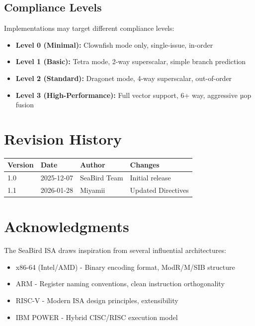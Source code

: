 \documentclass[12pt]{article}
\begin{document}
\subsection{Compliance Levels}

Implementations may target different compliance levels:

\begin{itemize}
    \item \textbf{Level 0 (Minimal):} Clownfish mode only, single-issue, in-order
    \item \textbf{Level 1 (Basic):} Tetra mode, 2-way superscalar, simple branch prediction
    \item \textbf{Level 2 (Standard):} Dragonet mode, 4-way superscalar, out-of-order
    \item \textbf{Level 3 (High-Performance):} Full vector support, 6+ way, aggressive µop fusion
\end{itemize}

\section{Revision History}

\begin{table}[h]
\centering
\begin{tabular}{@{}llll@{}}
\toprule
\textbf{Version} & \textbf{Date} & \textbf{Author} & \textbf{Changes} \\ \midrule
1.0 & 2025-12-07 & SeaBird Team & Initial release \\ 1.1 & 2026-01-28 & Miyamii & Updated Directives\\ \bottomrule
\end{tabular}
\end{table}

\section{Acknowledgments}

The SeaBird ISA draws inspiration from several influential architectures:

\begin{itemize}
    \item x86-64 (Intel/AMD) - Binary encoding format, ModR/M/SIB structure
    \item ARM - Register naming conventions, clean instruction orthogonality
    \item RISC-V - Modern ISA design principles, extensibility
    \item IBM POWER - Hybrid CISC/RISC execution model
\end{itemize}
\end{document}
